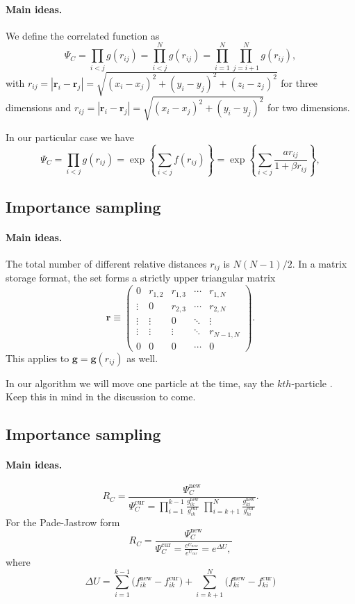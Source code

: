 \documentclass[%
twoside,                 %
final,                   %
10pt]{article}
\begin{document}
{{{{{{%
\paragraph{Main ideas.}
We define the correlated function as
\[
\Psi_C=\prod_{i< j}g(r_{ij})=\prod_{i< j}^Ng(r_{ij})= \prod_{i=1}^N\prod_{j=i+1}^Ng(r_{ij}),
\]
with 
$r_{ij}=|\mathbf{r}_i-\mathbf{r}_j|=\sqrt{(x_i-x_j)^2+(y_i-y_j)^2+(z_i-z_j)^2}$ for three dimensions and
$r_{ij}=|\mathbf{r}_i-\mathbf{r}_j|=\sqrt{(x_i-x_j)^2+(y_i-y_j)^2}$ for two dimensions.

In our particular case we have
\[
\Psi_C=\prod_{i< j}g(r_{ij})=\exp{\left\{\sum_{i<j}f(r_{ij})\right\}}=
\exp{\left\{\sum_{i<j}\frac{ar_{ij}}{1+\beta r_{ij}}\right\}},
\]




\subsection{Importance sampling}

\paragraph{Main ideas.}
The total number of different relative distances $r_{ij}$ is $N(N-1)/2$. In a matrix storage format, the set forms a strictly upper triangular matrix
\[
 \mathbf{r} \equiv \begin{pmatrix}
  0 & r_{1,2} & r_{1,3} & \cdots & r_{1,N} \\
  \vdots & 0       & r_{2,3} & \cdots & r_{2,N} \\
  \vdots & \vdots  & 0  & \ddots & \vdots  \\
  \vdots & \vdots  & \vdots  & \ddots  & r_{N-1,N} \\
  0 & 0  & 0  & \cdots  & 0
 \end{pmatrix}.
\]
This applies to  $\mathbf{g} = \mathbf{g}(r_{ij})$ as well. 

In our algorithm we will move one particle  at the time, say the $kth$-particle . Keep this in mind in the discussion to come.


\subsection{Importance sampling}

\paragraph{Main ideas.}
\[
R_{C} = \frac{\Psi_{C}^\mathrm{new}}{\Psi_{C}^\mathrm{cur} =
\prod_{i=1}^{k-1}\frac{g_{ik}^\mathrm{new}}{g_{ik}^\mathrm{cur}}\;
\prod_{i=k+1}^{N}\frac{g_{ki}^\mathrm{new}}{g_{ki}^\mathrm{cur}}}.
\]
For the Pade-Jastrow form
\[
 R_{C} = \frac{\Psi_{C}^\mathrm{new}}{\Psi_{C}^\mathrm{cur} = \frac{e^{U_{new}}}{e^{U_{cur}}} = e^{\Delta U},}
\]
where
\[
\Delta U =
\sum_{i=1}^{k-1}\big(f_{ik}^\mathrm{new}-f_{ik}^\mathrm{cur}\big)
+
\sum_{i=k+1}^{N}\big(f_{ki}^\mathrm{new}-f_{ki}^\mathrm{cur}\big)
\]




}}}}}}
\end{document}
